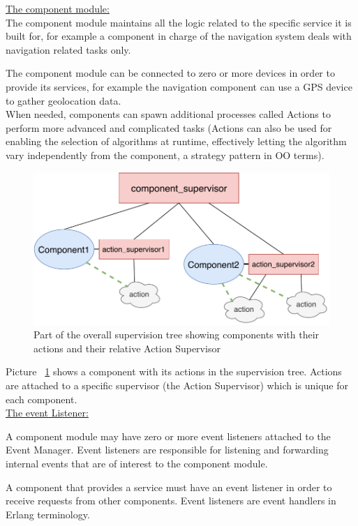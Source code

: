 \documentclass{memoir}
\begin{document}
\underline{The component module:}
\\
The component module maintains all the logic related to the specific service it is built for, for example a component in charge of the navigation system deals with navigation related tasks only.

The component module can be connected to zero or more devices in order to provide its services, for example the navigation component can use a GPS device to gather geolocation data. 
\\

When needed, components can spawn additional processes called Actions to perform more advanced and complicated tasks (Actions can also be used for enabling the selection of algorithms at runtime, effectively letting the algorithm vary independently from the component, a strategy pattern in OO terms).

\begin{figure}
	\centering
	\includegraphics[width=0.7\linewidth]{implementation_details/component_and_action.pdf}
	\caption{Part of the overall supervision tree showing components with their actions and their relative Action Supervisor}
	\label{fig:component-and-action}
\end{figure}

Picture ~\ref{fig:component-and-action} shows a component with its actions in the supervision tree. Actions are attached to a specific supervisor (the Action Supervisor) which is unique for each component.
\\

\underline{The event Listener:}


A component module may have zero or more event listeners attached to the Event Manager. Event listeners are responsible for listening and forwarding internal events that are of interest to the component module.

A component that provides a service must have an event listener in order to receive requests from other components. Event listeners are event handlers in Erlang terminology.
\end{document}
